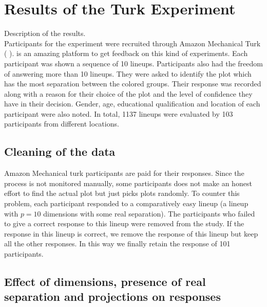 \documentclass[12]{article}
\begin{document}
\section{Results of the Turk Experiment}

{\color{red} Description of the results. }\\

Participants  for the experiment were recruited through Amazon Mechanical Turk ( \cite{turk} ).  \cite{turk} is an amazing platform to get feedback on this kind of experiments. Each participant was shown a sequence of 10 lineups. Participants also had the freedom of answering more than 10 lineups. They were asked to identify the plot which has the most separation between the colored groups. Their response was recorded along with a reason for their choice of the plot and the level of confidence they have in their decision.  Gender, age, educational qualification and location of each participant were also noted. In total, 1137 lineups were evaluated by 103 participants from different locations.

\subsection{Cleaning of the data}

Amazon Mechanical turk participants are paid for their responses. Since the process is not monitored manually, some participants does not make an honest effort to find the actual plot but just picks plots randomly. To counter this problem, each participant responded to a comparatively easy lineup (a lineup with $p = 10$ dimensions with some real separation). The participants who failed to give a correct response to this lineup were removed from the study. If the response in this lineup is correct, we remove the response of this lineup but keep all the other responses. In this way we finally retain the response of 101 participants.  

\subsection{Effect of dimensions, presence of real separation and projections on responses} 
\end{document}
